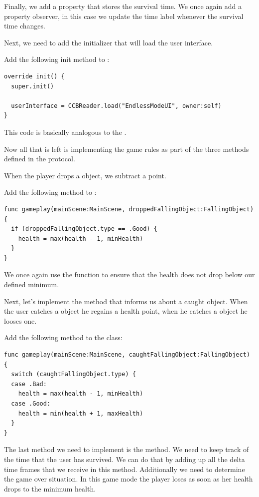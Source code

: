 Finally, we add a property that stores the survival time. We once again add a
property observer, in this case we update the time label whenever the survival
time changes.

Next, we need to add the initializer that will load the user interface.

\begin{leftbar}
Add the following init method to :
\begin{lstlisting}
override init() {
  super.init()
  
  userInterface = CCBReader.load("EndlessModeUI", owner:self)
}
\end{lstlisting}
\end{leftbar}
This code is basically analogous to the .

Now all that is left is implementing the game rules as part of the three methods
defined in the  protocol. 

When the player drops a  object, we subtract a point.
\begin{leftbar}
Add the following method to :
\begin{lstlisting}
func gameplay(mainScene:MainScene, droppedFallingObject:FallingObject) {
  if (droppedFallingObject.type == .Good) {
    health = max(health - 1, minHealth)
  }
}
\end{lstlisting}
\end{leftbar}
We once again use the  function to ensure that the health does
not drop below our defined minimum.

Next, let's implement the method that informs us about a caught object. When the
user catches a  object he regains a health point, when he
catches a  object he looses one.

\begin{leftbar}
Add the following method to the  class:
\begin{lstlisting}
func gameplay(mainScene:MainScene, caughtFallingObject:FallingObject) {
  switch (caughtFallingObject.type) {
  case .Bad:
    health = max(health - 1, minHealth)
  case .Good:
    health = min(health + 1, maxHealth)
  }
}
\end{lstlisting}
\end{leftbar}

The last method we need to implement is the  method. We need to keep track of the time that the user has survived.
We can do that by adding up all the delta time frames that we receive in this
method. Additionally we need to determine the game over situation. In this game
mode the player loses as soon as her health drops to the minimum health.


